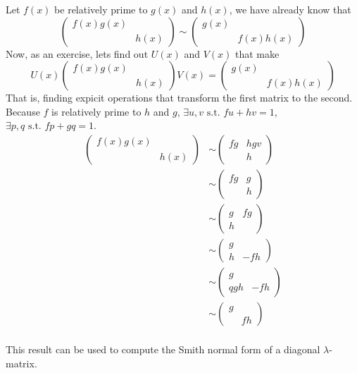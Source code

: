\begin{example}
Let $f(x)$ be relatively prime to $g(x)$ and $h(x)$, we have already know that 
\[\begin{pmatrix}f(x)g(x) & \\&h(x)\end{pmatrix}\sim \begin{pmatrix}
 g(x) & \\&f(x)h(x)\end{pmatrix}\] Now, as an exercise, lets find out $U(x)$ and $V(x)$ that make 
 \[U(x)\begin{pmatrix}f(x)g(x) & \\&h(x)\end{pmatrix}V(x)=\begin{pmatrix}
 g(x) & \\&f(x)h(x)\end{pmatrix}\]
That is, finding expicit operations that transform the first matrix to the second. Because $f$ is relatively prime to $h$ and $g$, $\exists u,v\text{ s.t. }fu+hv=1$,$\exists p,q\text{ s.t. }fp+gq=1$.
\begin{align*}
    \begin{pmatrix}f(x)g(x) & \\&h(x)\end{pmatrix}&\sim \begin{pmatrix}fg& hgv\\&h\end{pmatrix}\\
    &\sim \begin{pmatrix}fg& g\\&h\end{pmatrix}\\
    &\sim \begin{pmatrix}g& fg\\h&\end{pmatrix}\\
    &\sim \begin{pmatrix}g& \\h&-fh\end{pmatrix}\\
    &\sim \begin{pmatrix}g& \\qgh&-fh\end{pmatrix}\\
    &\sim \begin{pmatrix}g& \\&fh\end{pmatrix}\\
\end{align*}
\end{example}
\begin{remark}
This result can be used to compute the Smith normal form of a diagonal $\lambda$-matrix.
\end{remark}



